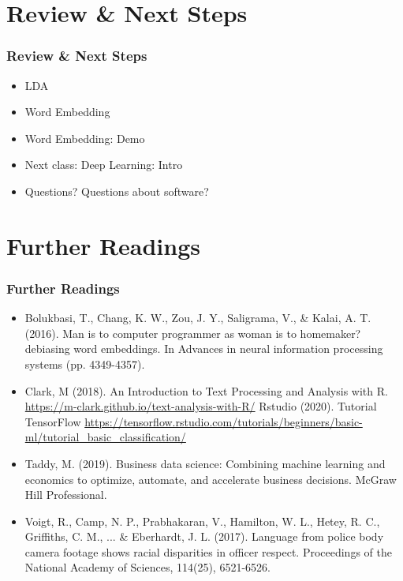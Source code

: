 \documentclass[
  shownotes,
  xcolor={svgnames},
  hyperref={colorlinks,citecolor=DarkBlue,linkcolor=DarkRed,urlcolor=DarkBlue}
  , aspectratio=169]{beamer}
\begin{document}
\section{Review
 \& Next Steps}
\begin{frame}
\frametitle{Review \& Next Steps}
  
\begin{itemize} 
  
\item LDA  
\medskip
\item  Word Embedding
\medskip
\item  Word Embedding: Demo


    \bigskip  
  \item  Next class:  Deep Learning: Intro


\bigskip  
\item Questions? Questions about software? 

\end{itemize}
\end{frame}


\section{Further Readings}
\begin{frame}
\frametitle{Further Readings}

\begin{itemize}
\footnotesize

  \medskip
  \item Bolukbasi, T., Chang, K. W., Zou, J. Y., Saligrama, V., \& Kalai, A. T. (2016). Man is to computer programmer as woman is to homemaker? debiasing word embeddings. In Advances in neural information processing systems (pp. 4349-4357).
  \medskip
  \item Clark, M (2018). An Introduction to Text Processing and Analysis with R. \url{https://m-clark.github.io/text-analysis-with-R/}
  \medskip
  Rstudio (2020). Tutorial TensorFlow \url{https://tensorflow.rstudio.com/tutorials/beginners/basic-ml/tutorial_basic_classification/}
  \medskip
  \item Taddy, M. (2019). Business data science: Combining machine learning and economics to optimize, automate, and accelerate business decisions. McGraw Hill Professional.
  \medskip
  \item Voigt, R., Camp, N. P., Prabhakaran, V., Hamilton, W. L., Hetey, R. C., Griffiths, C. M., ... \& Eberhardt, J. L. (2017). Language from police body camera footage shows racial disparities in officer respect. Proceedings of the National Academy of Sciences, 114(25), 6521-6526.

  
\end{itemize}

\end{frame}
\end{document}
